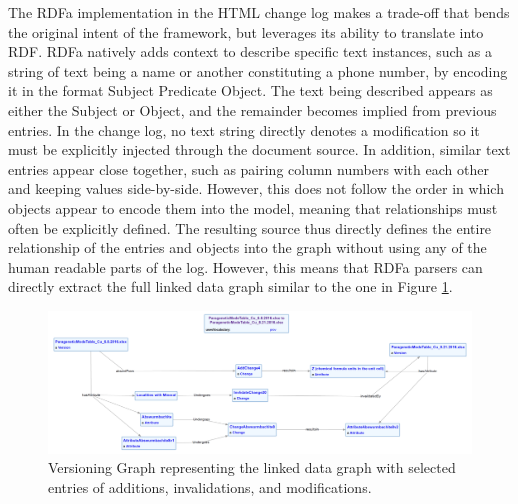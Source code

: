 The RDFa implementation in the HTML change log makes a trade-off that bends the original intent of the framework, but leverages its ability to translate into RDF.
RDFa natively adds context to describe specific text instances, such as a string of text being a name or another constituting a phone number, by encoding it in the format Subject Predicate Object.
The text being described appears as either the Subject or Object, and the remainder becomes implied from previous entries.
In the change log, no text string directly denotes a modification so it must be explicitly injected through the document source.
In addition, similar text entries appear close together, such as pairing column numbers with each other and keeping values side-by-side.
However, this does not follow the order in which objects appear to encode them into the model, meaning that relationships must often be explicitly defined.
The resulting source thus directly defines the entire relationship of the entries and objects into the graph without using any of the human readable parts of the log.
However, this means that RDFa parsers can directly extract the full linked data graph similar to the one in Figure \ref{CopperGraphVerGraph}.

\begin{figure}
	\centering
	\includegraphics[scale=0.23]{figures/VersioningGraph.png}
	\caption{Versioning Graph representing the linked data graph with selected entries of additions, invalidations, and modifications. }
	\label{CopperGraphVerGraph}
\end{figure}
